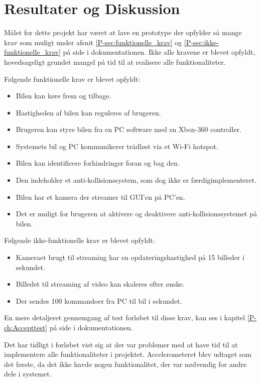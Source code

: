 \chapter{Resultater og Diskussion} \label{ch:Resultater_og_diskussion}

Målet for dette projekt har været at lave en prototype der opfylder så mange krav som muligt under afsnit \ref{P-sec:funktionelle_krav}  og \ref{P-sec:ikke-funktionelle_krav}  på side \pageref{P-sec:funktionelle_krav} i dokumentationen. 
Ikke alle kravene er blevet opfyldt, hovedsageligt grundet mangel på tid til at realisere alle funktionaliteter.

Følgende funktionelle krav er blevet opfyldt:
\begin{itemize}
	\item Bilen kan køre frem og tilbage. 
	\item Hastigheden af bilen kan reguleres af brugeren. 
	\item Brugeren kan styre bilen fra en PC software med en Xbox-360 controller. 			\item Systemets bil og PC kommunikerer trådløst via et Wi-Fi hotspot.
	\item Bilen kan identificere forhindringer foran og bag den. 
	\item Den indeholder et anti-kollisionssystem, som dog ikke er færdigimplementeret. 
	\item Bilen har et kamera der streamer til GUI'en på PC'en. 
	\item Det er muligt for brugeren at aktivere og deaktivere anti-kollisionssystemet på bilen.
\end{itemize}

Følgende ikke-funktionelle krav er blevet opfyldt: 
\begin{itemize}
	\item Kameraet brugt til streaming har en opdateringshastighed på 15 billeder i sekundet. 
	\item Billedet til streaming af video kan skaleres efter ønske. 
	\item Der sendes 100 kommandoer fra PC til bil i sekundet.
\end{itemize}

En mere detaljeret gennemgang af test forløbet til disse krav, kan ses i kapitel \ref{P-ch:Accepttest}  på side \pageref{P-ch:Accepttest} i dokumentationen.

Det har tidligt i forløbet vist sig at der var problemer med at have tid til at implementere alle funktionaliteter i projektet. Accelerometeret blev udtaget som det første, da det ikke havde nogen funktionalitet, der var nødvendig for andre dele i systemet.

